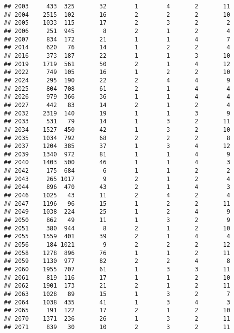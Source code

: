 \documentclass[]{article}
\begin{document}
\begin{verbatim}
## 2003     433  325       32        1        4       2       11
## 2004    2515  102       16        2        2       2       10
## 2005    1033  115       17        2        3       2        2
## 2006     251  945        8        2        1       2        4
## 2007     834  172       21        1        1       4        7
## 2014     620   76       14        1        2       2        4
## 2016     373  187       22        1        1       3       10
## 2019    1719  561       50        2        1       4       12
## 2022     749  105       16        1        2       2       10
## 2024     295  190       22        2        4       4        9
## 2025     804  708       61        2        1       4        4
## 2026     979  366       36        1        1       4        4
## 2027     442   83       14        2        1       2        4
## 2032    2319  140       19        1        1       3        9
## 2033     531   79       14        1        3       2       11
## 2034    1527  450       42        1        3       2       10
## 2035    1034  792       68        2        2       2        8
## 2037    1204  385       37        1        3       4       12
## 2039    1340  972       81        1        1       4        9
## 2040    1403  500       46        1        1       4        3
## 2042     175  684        6        1        1       2        2
## 2043     265 1017        9        2        1       2        4
## 2044     896  470       43        2        1       4        3
## 2046    1025   43       11        2        4       2        4
## 2047    1196   96       15        1        2       2       11
## 2049    1038  224       25        1        2       4        9
## 2050     862   49       11        1        3       2        9
## 2051     380  944        8        2        1       2       10
## 2055    1559  401       39        2        1       4        4
## 2056     184 1021        9        2        2       2       12
## 2058    1278  896       76        1        1       2       11
## 2059    1130  977       82        2        2       4        8
## 2060    1955  707       61        1        3       3       11
## 2061     819  116       17        1        1       2       10
## 2062    1901  173       21        2        1       2       11
## 2063    1028   89       15        1        3       2        7
## 2064    1038  435       41        1        3       4        3
## 2065     191  122       17        2        1       2       10
## 2070    1371  236       26        1        3       2       11
## 2071     839   30       10        2        3       2       11

\end{verbatim}
\end{document}

